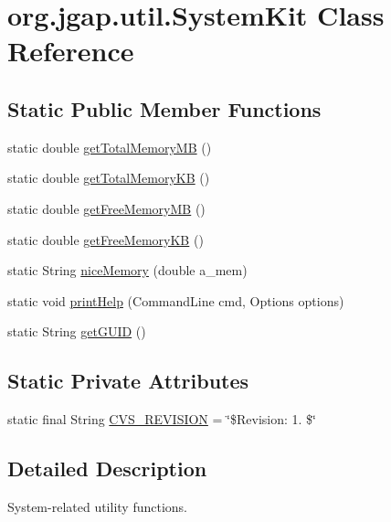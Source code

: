 \hypertarget{classorg_1_1jgap_1_1util_1_1_system_kit}{\section{org.\-jgap.\-util.\-System\-Kit Class Reference}
\label{classorg_1_1jgap_1_1util_1_1_system_kit}
}
\subsection*{Static Public Member Functions}
\begin{DoxyCompactItemize}
\item 
static double \hyperlink{classorg_1_1jgap_1_1util_1_1_system_kit_ab93ad5e72998c0c60ee04430e57ae5b1}{get\-Total\-Memory\-M\-B} ()
\item 
static double \hyperlink{classorg_1_1jgap_1_1util_1_1_system_kit_a8286a69a42d6d39ca8089b58fda1f299}{get\-Total\-Memory\-K\-B} ()
\item 
static double \hyperlink{classorg_1_1jgap_1_1util_1_1_system_kit_a14fa6748218ef523f4a712b414714c67}{get\-Free\-Memory\-M\-B} ()
\item 
static double \hyperlink{classorg_1_1jgap_1_1util_1_1_system_kit_ad527aca9750b94ef1687085c8559d575}{get\-Free\-Memory\-K\-B} ()
\item 
static String \hyperlink{classorg_1_1jgap_1_1util_1_1_system_kit_a8601680cfe02c9f1fcef4016a8eb1726}{nice\-Memory} (double a\-\_\-mem)
\item 
static void \hyperlink{classorg_1_1jgap_1_1util_1_1_system_kit_af04f11e440156a5e69819de4aa697ee1}{print\-Help} (Command\-Line cmd, Options options)
\item 
static String \hyperlink{classorg_1_1jgap_1_1util_1_1_system_kit_a6002e34d0dc5ee08b50c3994a15f6c29}{get\-G\-U\-I\-D} ()
\end{DoxyCompactItemize}
\subsection*{Static Private Attributes}
\begin{DoxyCompactItemize}
\item 
static final String \hyperlink{classorg_1_1jgap_1_1util_1_1_system_kit_aff55c878d4cb6c0754185300a3340685}{C\-V\-S\-\_\-\-R\-E\-V\-I\-S\-I\-O\-N} = \char`\"{}\$Revision\-: 1. \$\char`\"{}
\end{DoxyCompactItemize}


\subsection{Detailed Description}
System-\/related utility functions.

